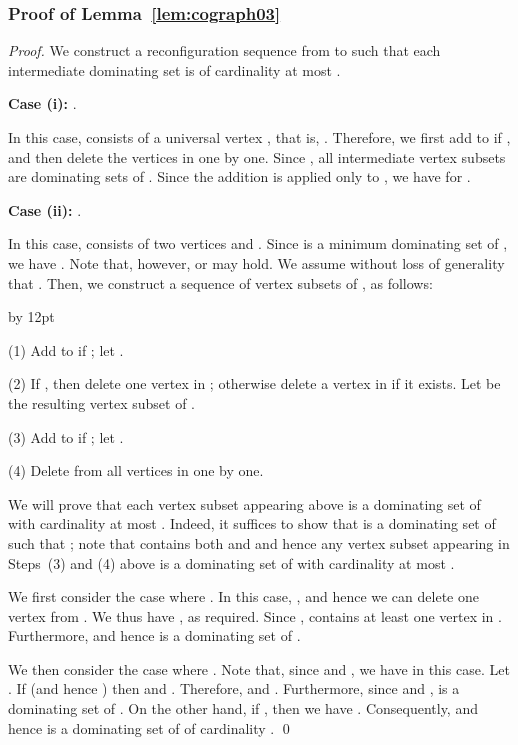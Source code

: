 \documentclass{llncs}
\newenvironment{listing}[1]{\begin{list}{*}{\settowidth{\labelwidth}{#1}\setlength{\leftmargin}{\labelwidth}\advance \leftmargin by 12pt
\setlength{\itemsep}{0pt}\setlength{\parsep}{0pt}\setlength{\topsep}{0pt}\setlength{\parskip}{0pt}}}{\end{list}}
\begin{document}
\subsubsection{Proof of Lemma~\ref{lem:cograph03}}
\begin{proof}
We construct a reconfiguration sequence from  to  such that
each intermediate dominating set is of cardinality at most .
\medskip

\noindent
{\bf Case (i):} .
	
In this case,  consists of a universal vertex , that is, .
Therefore, we first add  to  if , and then delete the vertices in  one by one.
Since , all intermediate vertex subsets are dominating sets of .
Since the addition is applied only to , we have  for .
\medskip

\noindent
{\bf Case (ii):} .

In this case,  consists of two vertices  and .
Since  is a minimum dominating set of , we have .
Note that, however,  or  may hold.
We assume without loss of generality that .
Then, we construct a sequence of vertex subsets of , as follows:
\begin{listing}{aaa}
	\item[(1)] Add  to  if ; let .
	\item[(2)] If , then delete
    one vertex in ; otherwise delete a vertex
    in  if it exists.
	Let  be the resulting vertex subset of .
	\item[(3)] Add  to  if ; let .
	\item[(4)] Delete from  all vertices in  one by one.
\end{listing}
We will prove that each vertex subset appearing above is a dominating set of  with cardinality at most .
Indeed, it suffices to show that  is a dominating set of  such that ;
note that  contains both  and  and hence
any vertex subset appearing in Steps~(3) and (4) above is a dominating set of  with cardinality at most .

We first consider the case where .
In this case, , and hence we
can delete one vertex   from .
We thus have , as required.
Since ,   contains at least one vertex in .
Furthermore,  and hence  is a dominating set of .
	
We then consider the case where .
Note that, since  and , we
have  in this case.
Let .
If  (and hence ) then 
and .
Therefore,  and .
Furthermore, since  and ,  is a dominating set of .
On the other hand, if , then we have .
Consequently,  and hence  is a dominating set of  of cardinality .
\qed
\end{proof}
\end{document}
